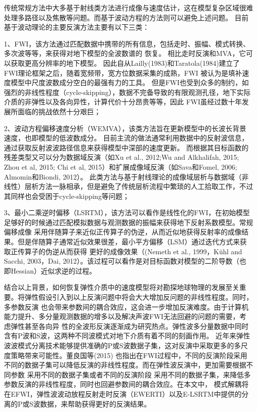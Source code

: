 传统常规方法中大多基于射线类方法进行成像与速度估计，这在模型复杂区域很难处理多路径以及焦散等问题。而基于波动方程的方法则可以避免上述问题。
目前基于波动理论的主要反演方法主要有以下三类：

1、FWI，该方法通过匹配数据中携带的所有信息，包括走时、振幅、模式转换、多次波等等，来获得对地下模型的全波数谱的
恢复。
相比走时反演和MVA，它可以获取更高分辨率的地下模型。
因此自从Lailly(1983)\cite{lailly1983seismic}和Taratola(1984)\cite{tarantola1984}建立了FWI理论框架之后，随着宽频带，宽方位数据采集的成熟，FWI
被认为是填补速度模型中尺度波数成分空白的最强有力的工具。
但是FWI也受到众多的制约，如强烈的非线性程度（cycle-skipping），数据不完备导致的有限观测孔径，地下实际介质的非弹性以及各向异性，计算代价十分昂贵等等，因此
FWI虽经过数十年发展所面临的挑战依然十分艰巨；

2、波动方程偏移速度分析（WEMVA），该类方法旨在更新模型中的长波长背景速度，也即模型的低波数成分。
目前主流的做法通常利用数据中的反射波信息，通过获取反射波波路径信息来获得模型中深部的速度更新。
而根据其目标函数的残差类型又可以分为数据域反演（如Xu et al., 2012\cite{xu:2012};Wu and Alkhalifah,
2015\cite[]{Wu2015b}; Zhou et al, 
2015\cite[]{zhou:2015}; Chi et al, 2015\cite{chi2015}）和扩展成像域反演（如Sava和Fomel, 2006\cite{Sava2006}; Almomin和Biondi, 2012\cite{Almomin2012}）。
此类方法与基于射线理论的成像域层析与数据域（非线性）层析方法一脉相承，但是避免了传统层析流程中繁琐的人工拾取工作，不过其同样也会受困于cycle-skipping等问题；

3、最小二乘逆时偏移（LSRTM），该方法可以看作是线性化的FWI，在初始模型足够好的时候通过匹配模拟数据与观测数据的振幅来获得地下反射系数模型。常规偏移成像
采用伴随算子来近似正传算子的伪逆，从而近似地获得反射率的成像结果。但是伴随算子通常近似效果很差，最小平方偏移（LSM）通过迭代方式来获取正传算子的伪逆从而获得
更好的成像效果（(Nemeth et al., 1999\cite{Nemeth1999}，Kühl and Sacchi\cite{KuehlEtAl2003}, 2003，Dai,
2012\cite{DaiEtAl2012}）。该过程可以看作是对目标函数对模型的二阶导数（也即Hessian）近似求逆的过程。

结合以上背景，如何恢复弹性介质中的速度模型将对勘探地球物理的发展至关重要。将弹性假设引入到以上反演问题中将会大大增加反问题的非线性程度。同时，多参数反演
也会带来参数间的耦合效应，这会进一步增加反演难度。由于计算机能力提升、多分量观测数据的增多以及解决声波FWI无法回避的问题的需要，考虑弹性甚至各向异
性的全波形反演逐渐成为研究热点。弹性波多分量数据中同时含有P波和S波，这两种不同波模式对地下介质有着不同的刻画作用。
近年来弹性波波模式分离技术能够提供准确的P或S波数据子集，这对反演中采取更多的多尺度策略带来可能性。董良国等(2015)\cite{董良国2015}
也指出在FWI过程中，不同的反演阶段采用不同的数据子集可以降低反演的非线性程度。而在弹性波反演中，更加需要根据不同参数
采用不同的数据子集或者不同的反演阶段
采用不同的数据子集，来降低多参数反演的非线性程度，同时也回避参数间的耦合效应。在本文中，
模式解耦将在EFWI，弹性波波动放程反射走时反演（EWERTI）以及E-LSRTM中提供的分离的P或S波数据，来帮助获得更好的反演结果。
